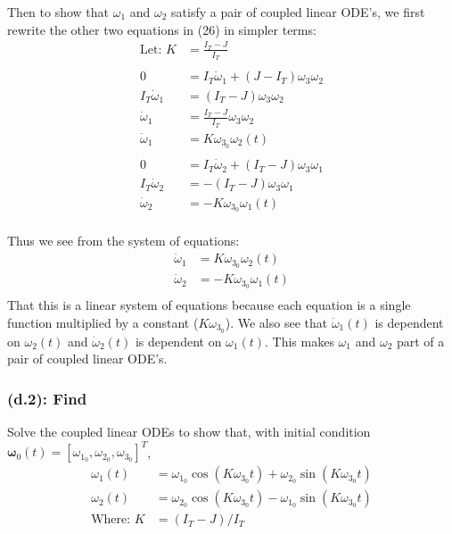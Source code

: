 \documentclass[titlepage]{article}
\begin{document}
Then to show that $\omega_1$ and $\omega_2$ satisfy a pair of coupled linear ODE's, we first rewrite the other two equations in (26) in simpler terms:
\begin{equation}
	\begin{split}
		\text{Let: }K&=\frac{I_T-J}{I_T}\\
		\\
		0&=I_T\dot{\omega}_1+\left(J-I_T\right)\omega_3\omega_2\\
		I_T\dot{\omega}_1&=\left(I_T-J\right)\omega_3\omega_2\\
		\dot{\omega}_1&=\frac{I_T-J}{I_T}\omega_3\omega_2\\
		\dot{\omega}_1&=K\omega_{3_0}\omega_2(t)\\
		\\
		0&=I_T\dot{\omega}_2+\left(I_T-J\right)\omega_3\omega_1\\
		I_T\dot{\omega}_2&=-\left(I_T-J\right)\omega_3\omega_1\\
		\dot{\omega}_2&=-K\omega_{3_0}\omega_1(t)\\
	\end{split}
\end{equation}

\begin{mdframed}[linewidth=1pt, innertopmargin=10pt, innerbottommargin=10pt]
	Thus we see from the system of equations:
	\begin{equation}
		\begin{split}
			\dot{\omega}_1&=K\omega_{3_0}\omega_2(t)\\
			\dot{\omega}_2&=-K\omega_{3_0}\omega_1(t)\\
		\end{split}
	\end{equation}
	That this is a linear system of equations because each equation is a single function multiplied by a constant ($K\omega_{3_0}$). We also see that $\dot{\omega}_1(t)$ is dependent on $\omega_2(t)$ and $\dot{\omega}_2(t)$ is dependent on $\omega_1(t)$. This makes $\omega_1$ and $\omega_2$ part of a pair of coupled linear ODE's.
\end{mdframed}

\subsubsection*{(d.2): Find}
Solve the coupled linear ODEs to show that, with initial condition $\boldsymbol{\omega}_0(t)=[\omega_{1_0},\omega_{2_0},\omega_{3_0}]^T$,
\begin{equation}
	\begin{split}
		\omega_1(t)&=\omega_{1_0}\cos(K\omega_{3_0}t)+\omega_{2_0}\sin(K\omega_{3_0}t) \\
		\omega_2(t)&=\omega_{2_0}\cos(K\omega_{3_0}t)-\omega_{1_0}\sin(K\omega_{3_0}t) \\
		\text{Where: }K&=(I_T-J)/I_T \\
	\end{split}
\end{equation}
\end{document}

